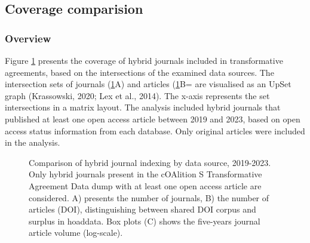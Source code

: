 \documentclass[a4paper,man,floatsintext,longtable,noextraspace,10pt]{apa6}
\begin{document}
\subsection{Coverage comparision}\label{coverage-comparision}

\subsubsection{Overview}\label{overview}

Figure \ref{fig-upset_coverage_results} presents the coverage of hybrid
journals included in transformative agreements, based on the
intersections of the examined data sources. The intersection sets of
journals (\ref{fig-upset_coverage_results}A) and articles
(\ref{fig-upset_coverage_results}B= are visualised as an UpSet graph
(Krassowski, 2020; Lex et al., 2014). The x-axis represents the set
intersections in a matrix layout. The analysis included hybrid journals
that published at least one open access article between 2019 and 2023,
based on open access status information from each database. Only
original articles were included in the analysis.

\begin{figure}[ht!]


\caption{\label{fig-upset_coverage_results}Comparison of hybrid journal
indexing by data source, 2019-2023. Only hybrid journals present in the
cOAlition S Transformative Agreement Data dump with at least one open
access article are considered. A) presents the number of journals, B)
the number of articles (DOI), distinguishing between shared DOI corpus
and surplus in hoaddata. Box plots (C) shows the five-years journal
article volume (log-scale).}

\end{figure}%
\end{document}
